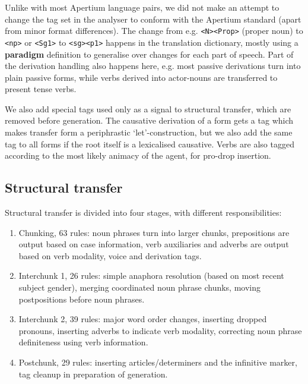 Unlike with most Apertium language pairs, we did not make an attempt
to change the tag set in the analyser to conform with the Apertium
standard (apart from minor format differences). The change from e.g.
\texttt{<N><Prop>} (proper noun) to \texttt{<np>} or \texttt{<Sg1>} to
\texttt{<sg><p1>} happens in the translation dictionary, mostly using a
\textbf{paradigm} definition to generalise over changes for each part
of speech. Part of the derivation handling also happens here, e.g. 
most passive derivations turn into plain passive forms, while verbs
derived into actor-nouns are transferred to present tense verbs.

We also add special tags used only as a signal to structural transfer,
which are removed before generation. The causative derivation of a
form gets a tag which makes transfer form a periphrastic
`let'-construction, but we also add the same tag to all forms if the
root itself is a lexicalised causative. Verbs are also tagged
according to the most likely animacy of the agent, for pro-drop
insertion.

\subsection{Structural transfer}
\label{sec:structural-transfer}
Structural transfer is divided into four stages, with different
responsibilities:

\begin{enumerate}

\item Chunking, 63 rules: noun phrases turn into larger chunks,
  prepositions are output based on case information, verb auxiliaries
  and adverbs are output based on verb modality, voice and derivation
  tags.

\item Interchunk 1, 26 rules: simple anaphora resolution (based on
  most recent subject gender), merging coordinated noun phrase chunks,
  moving postpositions before noun phrases.

\item Interchunk 2, 39 rules: major word order changes, inserting
  dropped pronouns, inserting adverbs to indicate verb modality,
  correcting noun phrase definiteness using verb information.

\item Postchunk, 29 rules: inserting articles/determiners and the
  infinitive marker, tag cleanup in preparation of generation.
\end{enumerate}

